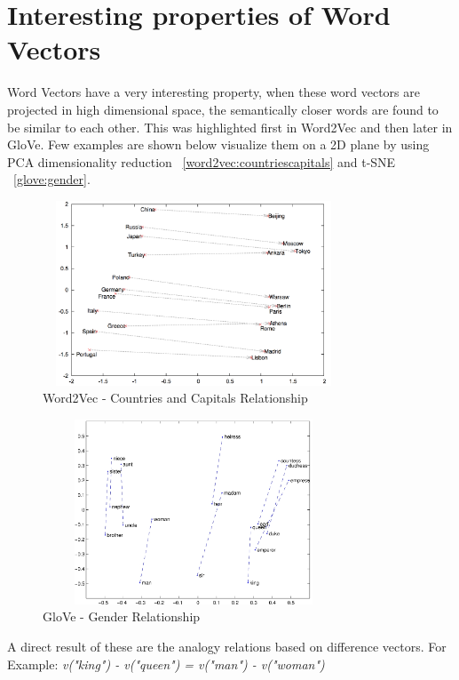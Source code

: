 \section{Interesting properties of Word Vectors}
Word Vectors have a very interesting property, when these word vectors are projected in high dimensional space, the semantically closer words are found to be similar to each other. This was highlighted first in Word2Vec and then later in GloVe. Few examples are shown below visualize them on a 2D plane by using PCA dimensionality reduction ~\autoref{word2vec:countriescapitals} and t-SNE  ~\autoref{glove:gender}.   

\begin{figure}[ht!]
	\centering
		\includegraphics[height=55mm,  width=90mm]{figures/4_countriescities.png}
		\caption[Word2Vec - Countries and Capitals]{Word2Vec - Countries and Capitals Relationship~\parencite{mikolov2}}
			\label{word2vec:countriescapitals}
\end{figure}

\begin{figure}[ht!]
	\centering
		\includegraphics[height=55mm,  width=90mm]{figures/4_manwoman.jpg}
		\caption[GloVe - Gender]{GloVe - Gender Relationship~\parencite{glove}}
			\label{glove:gender}
\end{figure}

A direct result of these are the analogy relations based on difference vectors. For Example:
\textit{v("king") - v("queen") = v("man") - v("woman")}